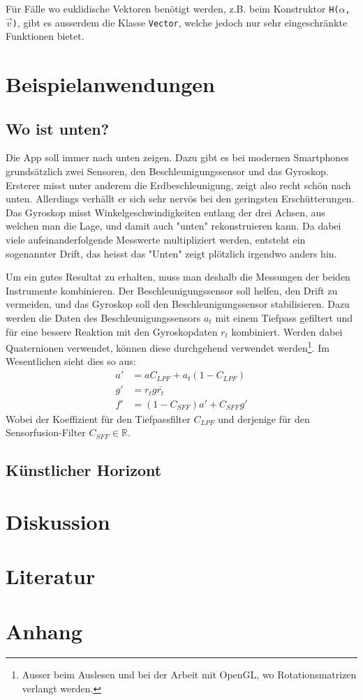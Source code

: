 \documentclass[12pt]{article}
\begin{document}
  Für Fälle wo euklidische Vektoren benötigt werden, z.B. beim Konstruktor \texttt{H($\alpha$, $\vec{v}$)}, gibt es ausserdem die Klasse \texttt{Vector}, welche jedoch nur sehr eingeschränkte Funktionen bietet.

  \section{Beispielanwendungen}
  \subsection{Wo ist unten?}

  Die App soll immer nach unten zeigen. Dazu gibt es bei modernen Smartphones grundsätzlich zwei Sensoren, den Beschleunigungssensor und das Gyroskop. Ersterer misst unter anderem die Erdbeschleunigung, zeigt also recht schön nach unten. Allerdings verhällt er sich sehr nervös bei den geringsten Erschütterungen. Das Gyroskop misst Winkelgeschwindigkeiten entlang der drei Achsen, aus welchen man die Lage, und damit auch "unten" rekonstruieren kann. Da dabei viele aufeinanderfolgende Messwerte multipliziert werden, entsteht ein sogenannter Drift, das heisst das "Unten" zeigt plötzlich irgendwo anders hin.

  Um ein gutes Resultat zu erhalten, muss man deshalb die Messungen der beiden Instrumente kombinieren. Der Beschleunigungssensor soll helfen, den Drift zu vermeiden, und das Gyroskop soll den Beschleunigungssensor stabilisieren. Dazu werden die Daten des Beschleunigungssensors $a_t$ mit einem Tiefpass gefiltert und für eine bessere Reaktion mit den Gyroskopdaten $r_t$ kombiniert. Werden dabei Quaternionen verwendet, können diese durchgehend verwendet werden\footnote{Ausser beim Auslesen und bei der Arbeit mit OpenGL, wo Rotationsmatrizen verlangt werden.}. Im Wesentlichen sieht dies so aus:
  \begin{align*}
    a' &= a C_{LPF} +  a_t (1 - C_{LPF}) \\
    g' &= r_t g \bar{r_t}    \\
    f' &= (1 - C_{SFF}) a' + C_{SFF} g'
  \end{align*}
  Wobei der Koeffizient für den Tiefpassfilter $C_{LPF}$ und derjenige für den Sensorfusion-Filter $C_{SFF} \in \mathbb{R}$.


  \subsection{Künstlicher Horizont}

  \section{Diskussion}

  \section{Literatur}

  \section{Anhang}
\end{document}
